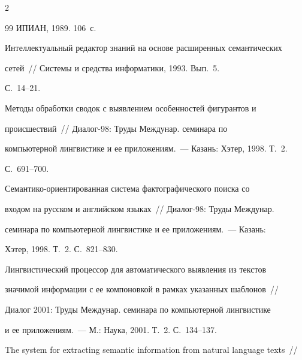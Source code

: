 \begin{multicols}{2}
{{\begin{thebibliography}{99}
ИПИАН, 1989. 106~с.






Интеллектуальный редактор знаний на основе расширенных семантических


сетей~// Системы и средства информатики, 1993.  Вып.~5.


С.~14--21.









 Методы обработки сводок с выявлением особенностей фигурантов и


происшествий~// Диалог-98: Труды Междунар. семинара по


компьютерной лингвистике и ее приложениям.~--- Казань: Хэтер, 1998.  Т.~2.


С.~691--700.









Се\-ман\-ти\-ко-ори\-ен\-ти\-ро\-ван\-ная сис\-те\-ма фактографического поиска со


входом на русском и английском языках~// Диалог-98: Труды Междунар.


семинара по компьютерной лингвистике и ее приложениям.~--- Казань:


Хэтер, 1998.  Т.~2. С.~821--830.









Лингвистический процессор для автоматического выявления из текстов


значимой информации с ее компоновкой в рамках указанных шаблонов~//


Диалог 2001: Труды Междунар. семинара по компьютерной лингвистике


и ее приложениям.~--- М.: Наука, 2001.  Т.~2. С.~134--137.






The system for extracting semantic information from natural language texts~//



\end{thebibliography}}}
\end{multicols}
